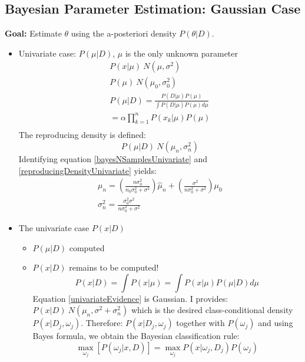 \subsection{Bayesian Parameter Estimation: Gaussian Case}
\textbf{Goal:} Estimate $\theta$ using the a-posteriori density $P(\theta | D)$. 

\begin{itemize}
	\item Univariate case: $P(\mu | D)$, $\mu$ is the only unknown parameter 
	\begin{eqnarray}
		P( x | \mu) ~ N( \mu , \sigma^2) \\
		P(\mu) ~ N( \mu_0 , \sigma_0^2 ) \\
		P(\mu | D) = \frac{P( D| \mu) P(\mu)}  {\int P(D | \mu) P(\mu) d\mu} \label{bayesNSamplesUnivariate}  \\
		= \alpha \prod _{k=1} ^n P( x_k | \mu) P(\mu) \\
	\end{eqnarray}
	The reproducing density is defined: 
	\begin{equation}
		P( \mu | D ) ~ N( \mu_n , \sigma_n ^2) \label{reproducingDensityUnivariate}
	\end{equation}
	Identifying equation \ref{bayesNSamplesUnivariate} and \ref{reproducingDensityUnivariate} yields:
	\begin{eqnarray}
		\mu _n = ( \frac{n \sigma_0^2}  {n_0 \sigma_0 ^2 + \sigma^2}  ) \hat{\mu}_n + (\frac{\sigma^2} {n \sigma_0 ^2 + \sigma^2}) \mu_0  \\
		\sigma_n ^2 = \frac{\sigma_0 ^2 \sigma^2} {n \sigma_0 ^2 + \sigma^2}
	\end{eqnarray}
	\item The univariate case $P(x | D)$
	\begin{itemize}
		\item $P( \mu | D)$ computed 
		\item $P(x | D)$ remains to be computed!  
		\begin{equation}
			P(x | D) = \int P(x | \mu) = \int P(x | \mu) P( \mu | D) d\mu \label{univariateEvidence}
		\end{equation}
		Equation \ref{univariateEvidence} is Gaussian.   I provides: $P(x |D) ~ N(\mu_n , \sigma^2 + \sigma_n ^2)$ which is the desired class-conditional density $P(x|D_j , \omega_j)$.  Therefore: $P(x | D_j , \omega_j)$ together with $P(\omega_j)$ and using Bayes formula, we obtain the Bayesian classification rule: 
		\begin{equation}
			\max _{\omega_j} [P(\omega_j | x , D)] = \max _{\omega_j}  P(x | \omega_j , D_j) P(\omega_j)
		\end{equation}
		
	\end{itemize}
\end{itemize}


